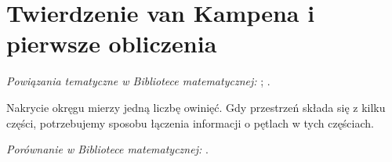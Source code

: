 \section{Twierdzenie van Kampena i pierwsze obliczenia}
\label{sec:van-kampen}

\noindent\emph{Powiązania tematyczne w Bibliotece matematycznej:} ; .


Nakrycie okręgu mierzy jedną liczbę owinięć.
Gdy przestrzeń składa się z kilku części,
potrzebujemy sposobu łączenia informacji
o pętlach w tych częściach.

\noindent\emph{Porównanie w Bibliotece matematycznej:} .

